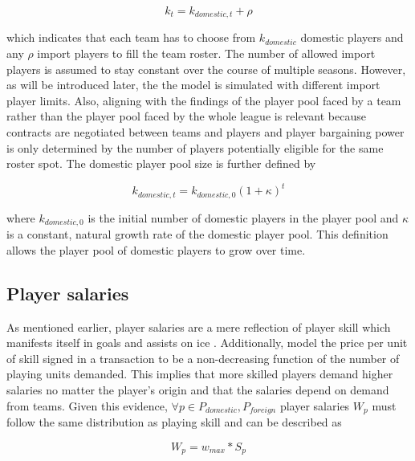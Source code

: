 \documentclass[12pt, a4paper]{article}
\begin{document}
\begin{equation}
k_t=k_{domestic,t}+\rho
\end{equation}

\noindent
which indicates that each team has to choose from $k_{domestic}$ domestic players and any $\rho$ import players to fill the team roster. The number of allowed import players is assumed to stay constant over the course of multiple seasons. However, as will be introduced later, the the model is simulated with different import player limits. Also, aligning with the findings of \citet[][]{bryson_all-star_2017} the player pool faced by a team rather than the player pool faced by the whole league is relevant because contracts are negotiated between teams and players and player bargaining power is only determined by the number of players potentially eligible for the same roster spot. The domestic player pool size is further defined by

\begin{equation}
k_{domestic,t}=k_{domestic,0}(1+\kappa)^t
\end{equation}

\noindent
where $k_{domestic,0}$ is the initial number of domestic players in the player pool and $\kappa$ is a constant, natural growth rate of the domestic player pool. This definition allows the player pool of domestic players to grow over time.


\subsection{Player salaries}
\label{playerSalaries}

As mentioned earlier, player salaries are a mere reflection of player skill which manifests itself in goals and assists on ice \citep[see][]{celik_salary_2017,coates_returns_2017,szymanski_market_2000}. Additionally, \citet{el-hodiri_economic_1971} model the price per unit of skill signed in a transaction to be a non-decreasing function of the number of playing units demanded. This implies that more skilled players demand higher salaries no matter the player's origin and that the salaries depend on demand from teams. Given this evidence, $\forall p \in P_{domestic}, P_{foreign}$ player salaries $W_p$ must follow the same distribution as playing skill and can be described as

\begin{equation}
\label{eq:salaries1}
W_p=w_{max}\ast S_p
\end{equation}
\end{document}
